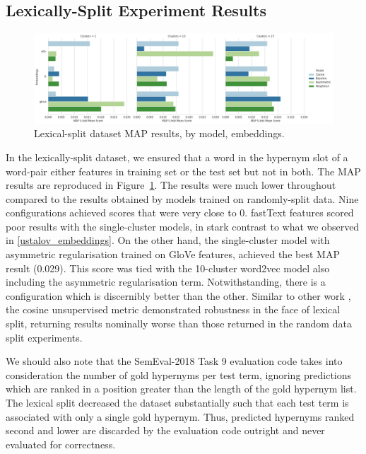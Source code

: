 \subsection{Lexically-Split Experiment Results}
\begin{figure}[ht!] 
  \centering
  \includegraphics[width=1.\linewidth]{images/MAP_lexical_split_results_models_baseline_embeddings.png}
  \caption{Lexical-split dataset MAP results, by model, embeddings.}
  \label{fig:lexsplit_ustalov_map}
\end{figure}
In the lexically-split dataset, we ensured that a word in the hypernym slot of a word-pair either features in training set or the test set but not in both.  The \ac{MAP} results are reproduced in Figure~\ref{fig:lexsplit_ustalov_map}.  The results were much lower throughout compared to the results obtained by models trained on randomly-split data.  Nine configurations achieved scores that were very close to 0.  fastText features scored poor results with the single-cluster models, in stark contrast to what we observed in \cref{ustalov_embeddings}.  On the other hand, the single-cluster model with asymmetric regularisation trained on GloVe features, achieved the best \ac{MAP} result (0.029).  This score was tied with the 10-cluster word2vec model also including the asymmetric regularisation term.  Notwithstanding, there is a configuration which is discernibly better than the other.  Similar to other work \citep{shwartz2017siege}, the cosine unsupervised metric demonstrated robustness in the face of lexical split, returning results nominally worse than those returned in the random data split experiments.

We should also note that the SemEval-2018 Task 9 evaluation code takes into consideration the number of gold hypernyms per test term, ignoring predictions which are ranked in a position greater than the length of the gold hypernym list.  The lexical split decreased the dataset substantially such that each test term is associated with only a single gold hypernym.  Thus, predicted hypernyms ranked second and lower are discarded by the evaluation code outright and never evaluated for correctness.  

